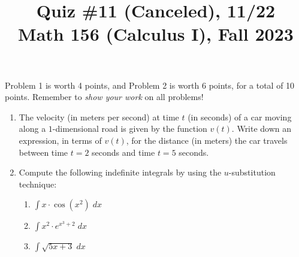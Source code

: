\documentclass[11pt]{article}
\title{Quiz \#11 (Canceled), 11/22 \\ Math 156 (Calculus I), Fall 2023}
\date{}
\begin{document}
\maketitle

\thispagestyle{empty}

\vspace{-1.75cm}

Problem 1 is worth 4 points, and Problem 2 is worth 6 points, for a total of 10 points. Remember to \emph{show your work} on all problems!

\begin{enumerate}
\item The velocity (in meters per second) at time $t$ (in seconds) of a car moving along a $1$-dimensional road is given by the function $v(t)$. Write down an expression, in terms of $v(t)$, for the distance (in meters) the car travels between time $t=2$ seconds and time $t=5$ seconds.

\vspace{3.5cm}

\item Compute the following indefinite integrals by using the $u$-substitution technique:
\begin{enumerate}
\item $\int x\cdot \cos(x^2) \; dx$
\item $\int x^2 \cdot e^{x^3+2} \; dx$
\item $\int \sqrt{5x+3} \; dx$
\end{enumerate}

\end{enumerate}
\end{document}
